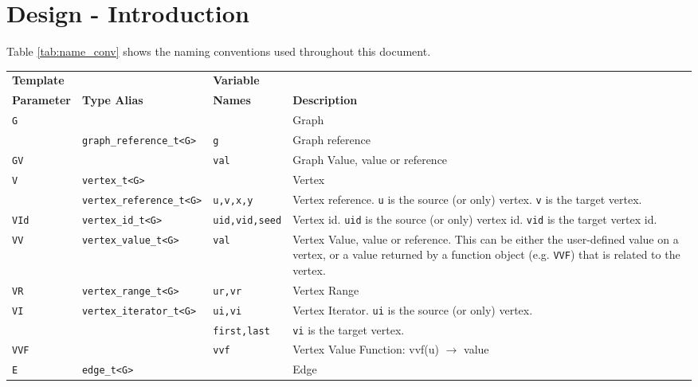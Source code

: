\documentclass[10pt,onecolumn]{article}
\newcommand{\tcode}[1]{\lstinline[breaklines=true]{#1}}
\begin{document}

\section{Design - Introduction}

Table \ref{tab:name_conv} shows the naming conventions used throughout this document. 

\begin{table}[h!]
\begin{center}
{\begin{tabular}{l l l p{7cm}}
\hline
    \textbf{Template} & & \textbf{Variable} & \\
    \textbf{Parameter} & \textbf{Type Alias} & \textbf{Names} & \textbf{Description} \\
\hline
    \tcode{G} & & & Graph \\
    & \tcode{graph_reference_t<G>} & \tcode{g} & Graph reference \\
    \tcode{GV} &  & \tcode{val} & Graph Value, value or reference \\
\hline
    \tcode{V} & \tcode{vertex_t<G>} & & Vertex \\
    & \tcode{vertex_reference_t<G>} & \tcode{u,v,x,y} & Vertex reference. \tcode{u} is the source (or only) vertex. \tcode{v} is the target vertex. \\
    \tcode{VId} & \tcode{vertex_id_t<G>} & \tcode{uid,vid,seed} & Vertex id. \tcode{uid} is the source (or only) vertex id. \tcode{vid} is the target vertex id. \\
    \tcode{VV} &  \tcode{vertex_value_t<G>} & \tcode{val} & Vertex Value, value or reference. This can be either the user-defined value on a vertex, or a value returned by a function object (e.g. \tcode{VVF}) that is related to the vertex. \\
    \tcode{VR} &  \tcode{vertex_range_t<G>} & \tcode{ur,vr} & Vertex Range \\
    \tcode{VI} & \tcode{vertex_iterator_t<G>} & \tcode{ui,vi} & Vertex Iterator. \tcode{ui} is the source (or only) vertex. \\
                    &  & \tcode{first,last} & \tcode{vi} is the target vertex. \\
    \tcode{VVF} & & \tcode{vvf} & Vertex Value Function: vvf(u) $\rightarrow$ value \\
\hline
    \tcode{E} & \tcode{edge_t<G>} & & Edge \\

\end{tabular}}
\end{center}
\end{table}
\end{document}
